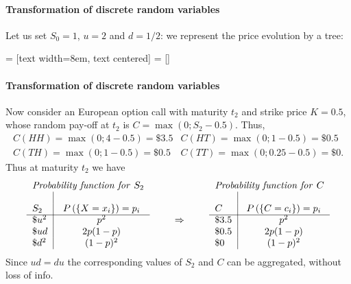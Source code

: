 \documentclass[notes=show,smaller,handout]{beamer}\usepackage[]{graphicx}\usepackage[]{color}
\renewcommand{\Pr}{P}
\begin{document}
\begin{frame}{\secname}
\framesubtitle{Transformation of discrete random variables}
\begin{example}[continued]
Let us set $S_0=1$, $u=2$ and $d=1/2$: we represent the price evolution by a tree:


%
 = [text width=8em, text centered]
 = []
\end{example}
\end{frame}%



\begin{frame}{\secname}
\framesubtitle{Transformation of discrete random variables}
  \begin{example}[continued]
  Now consider an European option call with maturity $t_2$ and strike price $K=0.5$, whose random pay-off at $t_2$ is $C=\max(0;S_2-0.5)$. Thus,
  \begin{eqnarray*}
  C(HH)=\max(0;4-0.5)=\$ 3.5 & C(HT)=\max(0;1-0.5)=\$ 0.5 \\
  C(TH)=\max(0;1-0.5)=\$ 0.5 & C(TT)=\max(0;0.25-0.5)=\$ 0.
  \end{eqnarray*}
  Thus at maturity $t_2$ we have
  \begin{equation*}
  \begin{tabular}{l|cll|c}
  \multicolumn{2}{l}{\emph{Probability function for }$S_2$} &  &
  \multicolumn{2}{l}{\emph{Probability function for }$C$} \\
  &  &  &  &  \\
  $S_2$ & $\Pr \left(\{ X=x_{i} \}\right) =p_{i}$ &  & $C$ & $\Pr \left(\{
  C=c_{i}  \}\right) =p_{i}$ \\ \cline{1-2}\cline{4-5}
  $\$ u^2$ & $p^2$ & $\qquad \Rightarrow \qquad $ & $\$ 3.5$ & $p^2$
  \\
  $\$ ud$ & $2p(1-p)$ &  & $\$ 0.5$ & $2p(1-p)$ \\
  $\$ d^2$ & $(1-p)^2$  &  & $\$ 0$ & $(1-p)^2$%
  \end{tabular}%
  \end{equation*}
  \tiny{Since $ud=du$ the corresponding values of $S_2$ and $C$ can be aggregated, without loss of info.}
  \end{example}
\end{frame}%
\end{document}
